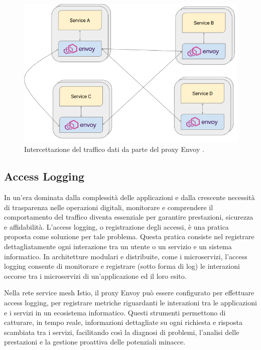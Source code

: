 \begin{figure}[h]
    \centering
    \includegraphics[width=1\linewidth]{immagini/capitolo2/envoy.png}
    \caption{Intercettazione del traffico dati da parte del proxy Envoy \cite{life_of_a_request}.}
    \label{fig:envoy}
\end{figure}


\subsection{Access Logging}

In un'era dominata dalla complessità delle applicazioni e dalla crescente necessità di trasparenza nelle operazioni digitali, monitorare e comprendere il comportamento del traffico diventa essenziale per garantire prestazioni, sicurezza e affidabilità. L'access logging, o registrazione degli accessi, è una pratica proposta come soluzione per tale problema. Questa pratica consiste nel registrare dettagliatamente ogni interazione tra un utente o un servizio e un sistema informatico. In architetture modulari e distribuite, come i microservizi, l'access logging consente di monitorare e registrare (sotto forma di log) le interazioni occorse tra i microservizi di un'applicazione ed il loro esito.

Nella rete service mesh Istio, il proxy Envoy può essere configurato per effettuare access logging, per registrare metriche riguardanti le interazioni tra le applicazioni e i servizi in un ecosistema informatico. Questi strumenti permettono di catturare, in tempo reale, informazioni dettagliate su ogni richiesta e risposta scambiata tra i servizi, facilitando così la diagnosi di problemi, l'analisi delle prestazioni e la gestione proattiva delle potenziali minacce.

